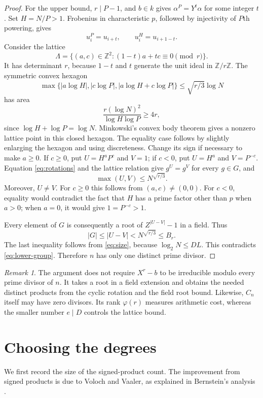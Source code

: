 \documentclass[11pt]{article}
\theoremstyle{definition}
\theoremstyle{remark}
\newtheorem{remark}[theorem]{Remark}
\newcommand{\Z}{\mathbb Z}
\begin{document}
\begin{proof}
For the upper bound, $r\mid P-1$, and $b\in k$ gives
$\alpha^P=Y^t\alpha$ for some integer $t$. Set $H=N/P>1$.
Frobenius in characteristic $p$, followed by injectivity of
$P$th powering, gives
\begin{equation}\label{eq:rotations}
 u_i^P=u_{i+t},\qquad u_i^H=u_{i+1-t}.
\end{equation}
Consider the lattice
\[
 \Lambda=\{(a,c)\in\Z^2:(1-t)a+tc\equiv0\pmod r\}.
\]
It has determinant $r$, because $1-t$ and $t$ generate the unit
ideal in $\Z/r\Z$. The symmetric convex hexagon
\[
 \max\{|a\log H|,|c\log P|,|a\log H+c\log P|\}
 \le \sqrt{r/3}\log N
\]
has area
\[
 \frac{r(\log N)^2}{\log H\log P}\ge4r,
\]
since $\log H+\log P=\log N$. Minkowski's convex body theorem
gives a nonzero lattice point in this closed hexagon. The equality
case follows by slightly enlarging the hexagon and using discreteness.
Change its sign if necessary to make $a\ge0$. If $c\ge0$, put
$U=H^aP^c$ and $V=1$; if $c<0$, put $U=H^a$ and $V=P^{-c}$.
Equation \eqref{eq:rotations} and the lattice relation give
$g^U=g^V$ for every $g\in G$, and
\[
 \max(U,V)\le N^{\sqrt{r/3}}.
\]
Moreover, $U\ne V$. For $c\ge0$ this follows from $(a,c)\ne(0,0)$.
For $c<0$, equality would contradict the fact that $H$ has a prime
factor other than $p$ when $a>0$; when $a=0$, it would give
$1=P^{-c}>1$.

Every element of $G$ is consequently a root of
$Z^{|U-V|}-1$ in a field. Thus
\[
 |G|\le |U-V|<N^{\sqrt{r/3}}\le B_r.
\]
The last inequality follows from \eqref{eq:size}, because
$\log_2 N\le DL$. This contradicts \eqref{eq:lower-group}.
Therefore $n$ has only one distinct prime divisor.
\end{proof}

\begin{remark}
The argument does not require $X^r-b$ to be irreducible modulo every
prime divisor of $n$. It takes a root in a field extension and obtains
the needed distinct products from the cyclic rotation and the field
root bound. Likewise, $C_n$ itself may have zero divisors. Its rank
$\varphi(r)$ measures arithmetic cost, whereas the smaller number
$e\mid D$ controls the lattice bound.
\end{remark}

\section{Choosing the degrees}\label{sec:degrees}

We first record the size of the signed-product count. The improvement
from signed products is due to Voloch and Vaaler, as explained in
Bernstein's analysis \cite[Section 3]{bernstein}.
\end{document}
